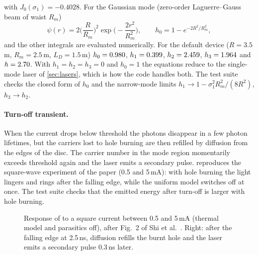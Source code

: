 with $J_0(\sigma_1)=-0.4028$. For the Gaussian mode (zero-order Laguerre--Gauss beam of waist $R_m$)
\begin{equation}
  \psi(r)=2\Big(\frac{R}{R_m}\Big)^2\exp\!\Big(-\frac{2r^2}{R_m^2}\Big),\qquad h_0=1-e^{-2R^2/R_m^2},
\end{equation}
and the other integrals are evaluated numerically. For the default device ($R=3.5$\,\textmu m,
$R_m=2.5$\,\textmu m, $L_D=1.5$\,\textmu m) $h_0=0.980$, $h_1=0.399$, $h_2=2.459$,
$h_3=1.964$ and $h=2.70$. With $h_1=h_2=h_3=0$ and $h_0=1$ the equations reduce to the single-mode
laser of \cref{sec:lasers}, which is how the code handles both. The test suite checks the closed form
of $h_0$ and the narrow-mode limits $h_1\to1-\sigma_1^2R_m^2/(8R^2)$, $h_3\to h_2$.

\paragraph{Turn-off transient.} When the current drops below threshold the photons disappear in
a few photon lifetimes, but the carriers lost to hole burning are then refilled by diffusion
from the edges of the disc. The carrier number in the mode region momentarily exceeds threshold
again and the laser emits a secondary pulse.  reproduces the square-wave
experiment of the paper (0.5 and 5\,mA): with hole burning the light lingers and rings after the
falling edge, while the uniform model switches off at once. The test suite checks that the
emitted energy after turn-off is larger with hole burning.

\begin{figure}[htbp]
\centering
{}
\caption{Response of  to a square current between 0.5 and 5\,mA (thermal model and
parasitics off), after Fig.~2 of Shi et al.~\cite{shi2009}. Right: after the falling edge at 2.5\,ns,
diffusion refills the burnt hole and the laser emits a secondary pulse 0.3\,ns later.}
\label{fig:vcsel-transient}
\end{figure}

